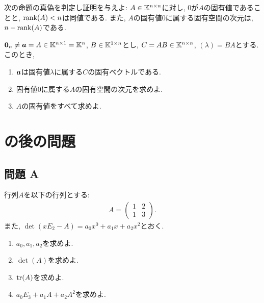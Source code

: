 \begin{quiz}
  次の命題の真偽を判定し証明を与えよ:
  $A\in\mathbb{K}^{n\times n}$に対し,
  $0$が$A$の固有値であることと,
  $\operatorname{rank}(A)<n$は同値である.
  また,
  $A$の固有値$0$に属する固有空間の次元は,
  $n-\operatorname{rank}(A)$である.
\end{quiz}

\begin{quiz}
  $\boldsymbol{0}_n\neq \boldsymbol{a}=A\in\mathbb{K}^{n\times 1}=\mathbb{K}^n$,
  $B\in\mathbb{K}^{1\times n}$とし,
  $C=AB\in\mathbb{K}^{n\times n}$, $(\lambda)=BA$とする.
  このとき,
  \begin{enumerate}
  \item $\boldsymbol{a}$は固有値$\lambda$に属する$C$の固有ベクトルである.
  \item 固有値$0$に属する$A$の固有空間の次元を求めよ.
  \item $A$の固有値をすべて求めよ.
  \end{enumerate}
\end{quiz}



\section{の後の問題}
\subsection{問題 A}
\begin{quiz}
  行列$A$を以下の行列とする:
  \begin{align*}
    A=\begin{pmatrix}1&2\\1&3\end{pmatrix}.
  \end{align*}
  また,
  $\det(xE_2-A)=a_0x^0+a_1x+a_2x^2$とおく.
  \begin{enumerate}
  \item $a_0,a_1,a_2$を求めよ.
  \item $\det(A)$を求めよ.
  \item $\operatorname{tr}(A)$を求めよ.
  \item $a_0E_3+a_1A+a_2A^2$を求めよ.
  \end{enumerate}
\end{quiz}

